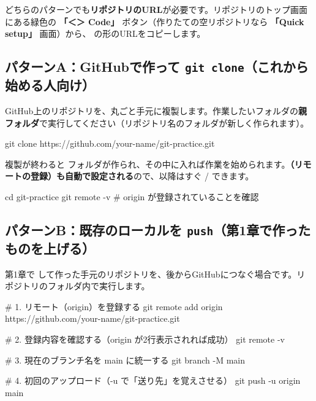 どちらのパターンでも\textbf{リポジトリのURL}が必要です。リポジトリのトップ画面にある緑色の \textbf{「＜＞ Code」} ボタン（作りたての空リポジトリなら \textbf{「Quick setup」} 画面）から、 の形のURLをコピーします。


\subsection{パターンA：GitHubで作って \texttt{git clone}（これから始める人向け）}

GitHub上のリポジトリを、丸ごと手元に複製します。作業したいフォルダの\textbf{親フォルダ}で実行してください（リポジトリ名のフォルダが新しく作られます）。

\begin{codebox}[bash]
\begin{code}
git clone https://github.com/your-name/git-practice.git
\end{code}
\end{codebox}

複製が終わると  フォルダが作られ、その中に入れば作業を始められます。\textbf{（リモートの登録）も自動で設定される}ので、以降はすぐ  /  できます。

\begin{codebox}[bash]
\begin{code}
cd git-practice
git remote -v   # origin が登録されていることを確認
\end{code}
\end{codebox}

\subsection{パターンB：既存のローカルを \texttt{push}（第1章で作ったものを上げる）}

第1章で  して作った手元のリポジトリを、後からGitHubにつなぐ場合です。リポジトリのフォルダ内で実行します。

\begin{codebox}[bash]
\begin{code}
# 1. リモート（origin）を登録する
git remote add origin https://github.com/your-name/git-practice.git

# 2. 登録内容を確認する（origin が2行表示されれば成功）
git remote -v

# 3. 現在のブランチ名を main に統一する
git branch -M main

# 4. 初回のアップロード（-u で「送り先」を覚えさせる）
git push -u origin main
\end{code}
\end{codebox}

